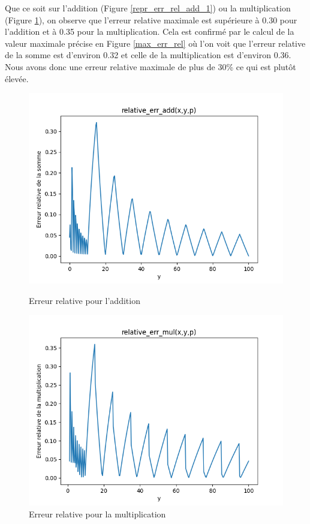 \documentclass{article}
\begin{document}
\begin{enumerate}
    Que ce soit sur l'addition (Figure \ref{repr_err_rel_add_1}) ou la multiplication (Figure \ref{repr_err_rel_mul_1}), on observe que l'erreur relative maximale est supérieure à 0.30 pour l'addition et à 0.35 pour la multiplication. Cela est confirmé par le calcul de la valeur maximale précise en Figure \ref{max_err_rel} où l'on voit que l'erreur relative de la somme est d'environ 0.32 et celle de la multiplication est d'environ 0.36. Nous avons donc une erreur relative maximale de plus de 30\% ce qui est plutôt élevée.
    
    \begin{figure}[H]
       \begin{minipage}{0.5\textwidth}
            \centering
            \includegraphics[width=1.1\linewidth]{images/relative_err_add_p1.png}
            \caption{Erreur relative pour l'addition}
            \label{repr_err_rel_add_1}
        \end{minipage}\hfill
        \begin{minipage}{0.5\textwidth}
            \centering
            \includegraphics[width=1.1\linewidth]{images/relative_err_mul_p1.png}
            \caption{Erreur relative pour la multiplication}
            \label{repr_err_rel_mul_1}
       \end{minipage}\hfill
    \end{figure}
    

\end{enumerate}
\end{document}
